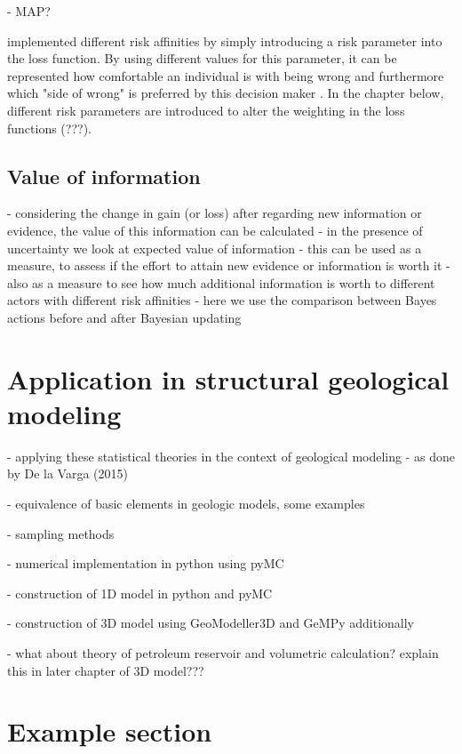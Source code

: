         - MAP?
        
        \cite{davidson2015} implemented different risk affinities by simply  introducing a risk parameter into the loss function. By using different values for this parameter, it can be represented how comfortable an individual is with being wrong and furthermore which "side of wrong" is preferred by this decision maker \cite{davidson2015}. In the chapter below, different risk parameters are introduced to alter the weighting in the loss functions (???).
        
        \subsection{Value of information}
        - considering the change in gain (or loss) after regarding new information or evidence, the value of this information can be calculated
        - in the presence of uncertainty we look at expected value of information
        - this can be used as a measure, to assess if the effort to attain new evidence or information is worth it
        - also as a measure to see how much additional information is worth to different actors with different risk affinities
        - here we use the comparison between Bayes actions before and after Bayesian updating
        
        \section{Application in structural geological modeling}
        
        - applying these statistical theories in the context of geological modeling 
        - as done by De la Varga (2015)
        
        - equivalence of basic elements in geologic models, some examples
        
        - sampling methods
        
        - numerical implementation in python using pyMC
        
        - construction of 1D model in python and pyMC
        
        - construction of 3D model using GeoModeller3D and GeMPy additionally
        
        - what about theory of petroleum reservoir and volumetric calculation? explain this in later chapter of 3D model???          

        \section{Example section}

